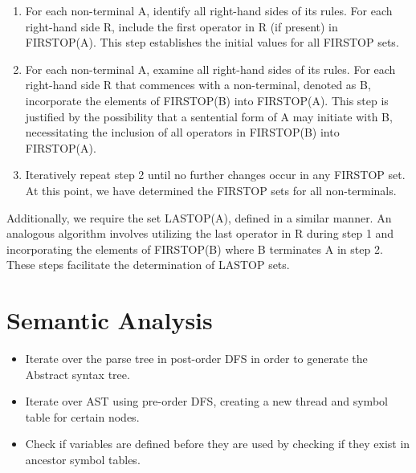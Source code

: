 \begin{enumerate}

	\item For each non-terminal A, identify all right-hand sides of its rules.
	For each right-hand side R, include the first operator in R (if present) in
	FIRSTOP(A). This step establishes the initial values for all FIRSTOP sets.

    \item For each non-terminal A, examine all right-hand sides of its rules.
For each right-hand side R that commences with a non-terminal, denoted as
B, incorporate the elements of FIRSTOP(B) into FIRSTOP(A). This step is
justified by the possibility that a sentential form of A may initiate with B,
necessitating the inclusion of all operators in FIRSTOP(B) into FIRSTOP(A).

    \item Iteratively repeat step 2 until no further changes occur in any
FIRSTOP set. At this point, we have determined the FIRSTOP sets for all
non-terminals.
\end{enumerate}

Additionally, we require the set LASTOP(A), defined in a similar manner. An analogous algorithm involves utilizing the last operator in R during step 1 and incorporating the elements of FIRSTOP(B) where B terminates A in step 2. These steps facilitate the determination of LASTOP sets.


\section{Semantic Analysis}
\begin{itemize}
	\item Iterate over the parse tree in post-order DFS in order to generate the Abstract syntax tree.
	\item Iterate over AST using pre-order DFS, creating a new thread and symbol table for certain nodes.
	\item Check if variables are defined before they are used by checking if they exist in ancestor symbol tables.
\end{itemize}



